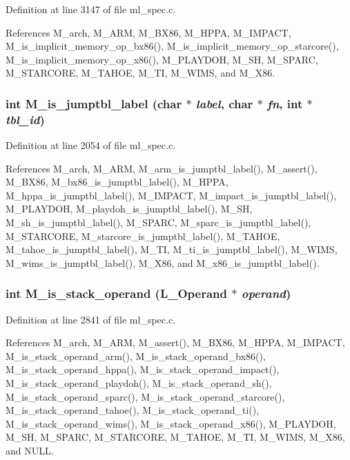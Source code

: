 Definition at line 3147 of file ml\_\-spec.c.

References M\_\-arch, M\_\-ARM, M\_\-BX86, M\_\-HPPA, M\_\-IMPACT, M\_\-is\_\-implicit\_\-memory\_\-op\_\-bx86(), M\_\-is\_\-implicit\_\-memory\_\-op\_\-starcore(), M\_\-is\_\-implicit\_\-memory\_\-op\_\-x86(), M\_\-PLAYDOH, M\_\-SH, M\_\-SPARC, M\_\-STARCORE, M\_\-TAHOE, M\_\-TI, M\_\-WIMS, and M\_\-X86.
\subsubsection{\setlength{\rightskip}{0pt plus 5cm}int M\_\-is\_\-jumptbl\_\-label (char $\ast$ {\em label}, char $\ast$ {\em fn}, int $\ast$ {\em tbl\_\-id})}\label{m__spec_8h_6a8ca9d52df2e31d349b77a6a63284e2}




Definition at line 2054 of file ml\_\-spec.c.

References M\_\-arch, M\_\-ARM, M\_\-arm\_\-is\_\-jumptbl\_\-label(), M\_\-assert(), M\_\-BX86, M\_\-bx86\_\-is\_\-jumptbl\_\-label(), M\_\-HPPA, M\_\-hppa\_\-is\_\-jumptbl\_\-label(), M\_\-IMPACT, M\_\-impact\_\-is\_\-jumptbl\_\-label(), M\_\-PLAYDOH, M\_\-playdoh\_\-is\_\-jumptbl\_\-label(), M\_\-SH, M\_\-sh\_\-is\_\-jumptbl\_\-label(), M\_\-SPARC, M\_\-sparc\_\-is\_\-jumptbl\_\-label(), M\_\-STARCORE, M\_\-starcore\_\-is\_\-jumptbl\_\-label(), M\_\-TAHOE, M\_\-tahoe\_\-is\_\-jumptbl\_\-label(), M\_\-TI, M\_\-ti\_\-is\_\-jumptbl\_\-label(), M\_\-WIMS, M\_\-wims\_\-is\_\-jumptbl\_\-label(), M\_\-X86, and M\_\-x86\_\-is\_\-jumptbl\_\-label().
\subsubsection{\setlength{\rightskip}{0pt plus 5cm}int M\_\-is\_\-stack\_\-operand (L\_\-Operand $\ast$ {\em operand})}\label{m__spec_8h_bb03a49acf1e9ab9301d646ec9f6ae5c}




Definition at line 2841 of file ml\_\-spec.c.

References M\_\-arch, M\_\-ARM, M\_\-assert(), M\_\-BX86, M\_\-HPPA, M\_\-IMPACT, M\_\-is\_\-stack\_\-operand\_\-arm(), M\_\-is\_\-stack\_\-operand\_\-bx86(), M\_\-is\_\-stack\_\-operand\_\-hppa(), M\_\-is\_\-stack\_\-operand\_\-impact(), M\_\-is\_\-stack\_\-operand\_\-playdoh(), M\_\-is\_\-stack\_\-operand\_\-sh(), M\_\-is\_\-stack\_\-operand\_\-sparc(), M\_\-is\_\-stack\_\-operand\_\-starcore(), M\_\-is\_\-stack\_\-operand\_\-tahoe(), M\_\-is\_\-stack\_\-operand\_\-ti(), M\_\-is\_\-stack\_\-operand\_\-wims(), M\_\-is\_\-stack\_\-operand\_\-x86(), M\_\-PLAYDOH, M\_\-SH, M\_\-SPARC, M\_\-STARCORE, M\_\-TAHOE, M\_\-TI, M\_\-WIMS, M\_\-X86, and NULL.
